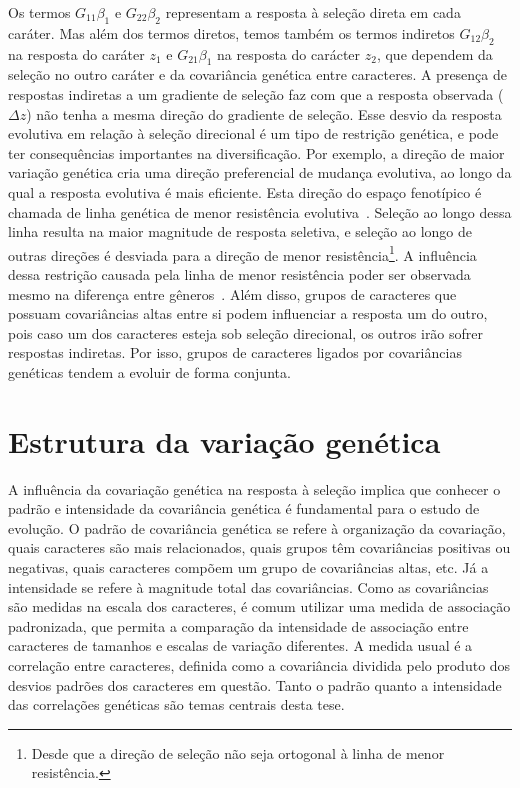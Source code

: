 \begin{refsection}
Os termos $G_{11}\beta_{1}$ e $G_{22}\beta_{2}$ representam a resposta à
seleção direta em cada caráter. Mas além dos termos diretos, temos também  os
termos indiretos $G_{12}\beta_{2}$ na resposta do caráter $z_1$ e
$G_{21}\beta_{1}$ na resposta do carácter $z_2$, que dependem da seleção no
outro caráter e da covariância genética entre caracteres. A presença de
respostas indiretas a um gradiente de seleção faz com que a resposta observada
($\Delta z$) não tenha a mesma direção do gradiente de seleção. Esse desvio da
resposta evolutiva em relação à seleção direcional é um tipo de
restrição genética, e pode ter consequências importantes na diversificação.
Por exemplo, a direção de maior variação genética cria uma direção
preferencial de mudança evolutiva, ao longo da qual a resposta evolutiva é
mais eficiente. Esta direção do espaço fenotípico é chamada de linha genética
de menor resistência evolutiva~\parencite{Schluter1996-gw}. Seleção ao longo
dessa linha resulta na maior magnitude de resposta seletiva, e seleção ao
longo de outras direções é desviada para a direção de menor
resistência\footnote{Desde que a direção de seleção não seja ortogonal à linha
de menor resistência.}. A influência dessa restrição causada pela linha de
menor resistência poder ser observada mesmo na diferença entre
gêneros~\parencite{Marroig2005-ce}. Além disso, grupos de caracteres que
possuam covariâncias altas entre si podem influenciar a resposta um do outro,
pois caso um dos caracteres esteja sob seleção direcional, os outros
irão sofrer respostas indiretas. Por isso, grupos de caracteres ligados por
covariâncias genéticas tendem a evoluir de forma conjunta.

\section{Estrutura da variação genética}

A influência da covariação genética na resposta à seleção implica que conhecer
o padrão e intensidade da covariância genética é fundamental para o estudo de
evolução. O padrão de covariância genética se refere à organização da
covariação, quais caracteres são mais relacionados, quais grupos têm
covariâncias positivas ou negativas, quais caracteres compõem um grupo de
covariâncias altas, etc. Já a intensidade se refere à magnitude total das
covariâncias. Como as covariâncias são medidas na escala dos caracteres, é
comum utilizar uma medida de associação padronizada, que permita a comparação
da intensidade de associação entre caracteres de tamanhos e escalas de
variação diferentes. A medida usual é a correlação entre caracteres, definida
como a covariância dividida pelo produto dos desvios padrões dos caracteres em
questão. Tanto o padrão quanto a intensidade das correlações genéticas são temas
centrais desta tese.


\end{refsection}
